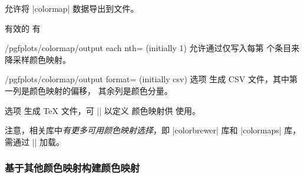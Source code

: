 \begin{command}{\pgfplotscolormaptodatafile{}}
    允许将 |colormap| 数据导出到文件。
\begin{codeexample}[]
\end{codeexample}

\begin{codeexample}[]
\end{codeexample}

    有效的  有
    \begin{pgfplotskey}{/pgfplots/colormap/output each nth= (initially 1)}
        允许通过仅写入每第  个条目来降采样颜色映射。
    \end{pgfplotskey}

    \begin{pgfplotskey}{/pgfplots/colormap/output format= (initially csv)}
        选项  生成 CSV 文件，其中第一列是颜色映射的偏移，
        其余列是颜色分量。

        选项  生成 \TeX{} 文件，可 || 以定义
        颜色映射供 \PGFPlots{} 使用。
    \end{pgfplotskey}
\end{command}

注意，相关库中\emph{有更多可用颜色映射选择}，即 |colorbrewer| 库和
|colormaps| 库，需通过 || 加载。


\subsubsection{基于其他颜色映射构建颜色映射}
\label{sec:pgfplots:colormaps:based:on:others}

